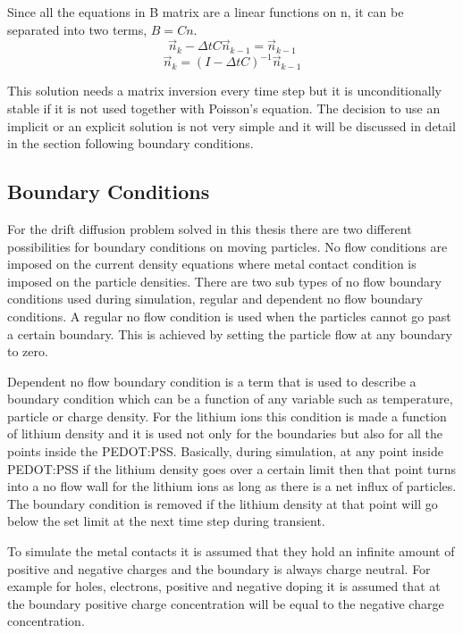 \begin{doublespace}
Since all the equations in B matrix are a linear functions on n, it can be separated into two terms, $B=Cn$.
\begin{equation}\nonumber
\vec{n}_{k}-\Delta t C\vec{n}_{k-1} =\vec{n}_{k-1}
\end{equation}
\begin{equation}
\vec{n}_k=(I-\Delta t C)^{-1}\vec{n}_{k-1}
\end{equation}

This solution needs a matrix inversion every time step but it is unconditionally stable if it is not used together with Poisson's equation. The decision to use an implicit or an explicit solution is not very simple and it will be discussed in detail in the section following boundary conditions.
\clearpage


\subsection{Boundary Conditions}

For the drift diffusion problem solved in this thesis there are two different possibilities for boundary conditions on moving particles. No flow conditions are imposed on the current density equations where metal contact condition is imposed on the particle densities. There are two sub types of no flow boundary conditions used during simulation, regular and dependent no flow boundary conditions. A regular no flow condition is used when the particles cannot go past a certain boundary. This is achieved by setting the particle flow at any boundary to zero. 

Dependent no flow boundary condition is a term that is used to describe a boundary condition which can be a function of any variable such as temperature, particle or charge density. For the lithium ions this condition is made a function of lithium density and it is used not only for the boundaries but also for all the points inside the PEDOT:PSS. Basically, during simulation, at any point inside PEDOT:PSS if the lithium density goes over a certain limit then that point turns into a no flow wall for the lithium ions as long as there is a net influx of particles. The boundary condition is removed if the lithium density at that point will go below the set limit at the next time step during transient.  

To simulate the metal contacts it is assumed that they hold an infinite amount of positive and negative charges and the boundary is always charge neutral. For example for holes, electrons, positive and negative doping it is assumed that at the boundary positive charge concentration will be equal to the negative charge concentration. 


\end{doublespace}

